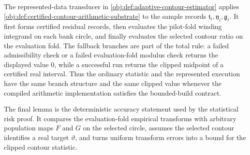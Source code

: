 \documentclass[11pt]{article}
\begin{document}
The represented-data transducer in \cref{obj:def:adaptive-contour-estimator} applies \cref{obj:def:certified-contour-arithmetic-substrate} to the sample records \(\mathfrak t_i,\mathfrak y_i,\mathfrak g_i\). It first forms certified residual records, then evaluates the pilot-fold winding integrand on each bank circle, and finally evaluates the selected contour ratio on the evaluation fold. The fallback branches are part of the total rule: a failed admissibility check or a failed evaluation-fold modulus check returns the displayed value \(0\), while a successful run returns the clipped midpoint of a certified real interval. Thus the ordinary statistic and the represented execution have the same branch structure and the same clipped value whenever the compiled arithmetic implementation satisfies the bounded-build contract.

The final lemma is the deterministic accuracy statement used by the statistical risk proof. It compares the evaluation-fold empirical transforms with arbitrary population maps \(F\) and \(G\) on the selected circle, assumes the selected contour identifies a real target \(\vartheta\), and turns uniform transform errors into a bound for the clipped contour statistic.
\end{document}
